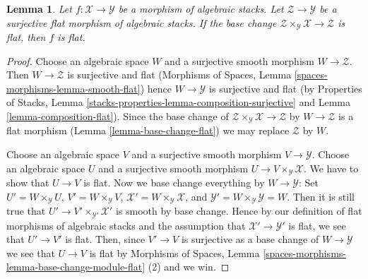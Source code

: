 \documentclass[10pt,a4paper]{amsart}
\theoremstyle{plain}
\newtheorem{lemma}[subsection]{Lemma}
\theoremstyle{definition}
\theoremstyle{remark}
\numberwithin{equation}{subsection}
\begin{document}
\begin{lemma}
\label{lemma-descent-flat}
Let $f : \mathcal{X} \to \mathcal{Y}$ be a morphism of algebraic stacks.
Let $\mathcal{Z} \to \mathcal{Y}$ be a surjective flat morphism of algebraic
stacks. If the base change
$\mathcal{Z} \times_\mathcal{Y} \mathcal{X} \to \mathcal{Z}$
is flat, then $f$ is flat.
\end{lemma}

\begin{proof}
Choose an algebraic space $W$ and a surjective smooth morphism
$W \to \mathcal{Z}$. Then $W \to \mathcal{Z}$ is surjective and flat
(Morphisms of Spaces, Lemma \ref{spaces-morphisms-lemma-smooth-flat})
hence $W \to \mathcal{Y}$ is surjective and flat (by
Properties of Stacks, Lemma
\ref{stacks-properties-lemma-composition-surjective}
and
Lemma \ref{lemma-composition-flat}).
Since the base change of
$\mathcal{Z} \times_\mathcal{Y} \mathcal{X} \to \mathcal{Z}$
by $W \to \mathcal{Z}$ is a flat morphism
(Lemma \ref{lemma-base-change-flat})
we may replace $\mathcal{Z}$ by $W$.

\medskip\noindent
Choose an algebraic space $V$ and a surjective smooth morphism
$V \to \mathcal{Y}$. Choose an algebraic space $U$ and a surjective
smooth morphism $U \to V \times_\mathcal{Y} \mathcal{X}$.
We have to show that $U \to V$ is flat. Now we base change
everything by $W \to \mathcal{Y}$: Set $U' = W \times_\mathcal{Y} U$,
$V' = W \times_\mathcal{Y} V$,
$\mathcal{X}' = W \times_\mathcal{Y} \mathcal{X}$,
and $\mathcal{Y}' = W \times_\mathcal{Y} \mathcal{Y} = W$.
Then it is still true that $U' \to V' \times_{\mathcal{Y}'} \mathcal{X}'$
is smooth by base change. Hence by our definition of flat morphisms
of algebraic stacks and the assumption that $\mathcal{X}' \to \mathcal{Y}'$
is flat, we see that $U' \to V'$ is flat. Then, since
$V' \to V$ is surjective as a base change of $W \to \mathcal{Y}$ we see
that $U \to V$ is flat by
Morphisms of Spaces, Lemma
\ref{spaces-morphisms-lemma-base-change-module-flat} (2)
and we win.
\end{proof}
\end{document}
